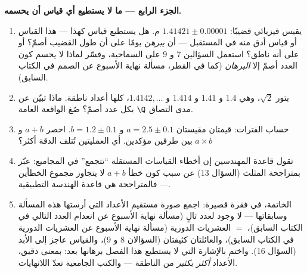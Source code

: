 \begin{problem}
\medskip
\noindent\textbf{الجزء الرابع --- ما لا يستطيع أي قياس أن يحسمه.}
\begin{enumerate}[resume]
  \item يقيس فيزيائي قضيبًا: $1.41421 \pm 0.00001$ م.
        هل يستطيع قياس كهذا --- هذا القياس أو قياس
        أدق منه في المستقبل --- أن \emph{يبرهن} يومًا على أن طول
        القضيب أصمّ؟ أو على أنه ناطق؟ استعمل السؤالين 7
        و 9 على  السماحية، وفسّر لماذا لا يحسم
        كون العدد أصمّ إلا \emph{البرهان} (كما في القطر، مسألة نهاية الأسبوع عن الصمم في الكتاب السابق).
  \item بتور $\sqrt2$، وهي $1.4$ و $1.41$ و $1.414$ و $1.4142,\dots$،
        كلها أعداد ناطقة. ماذا تبيّن عن
        مدى التصاق $\Q$ بكل عدد أصمّ؟
        صُغ الواقعة العامة.
  \item حساب الفترات: قيمتان مقيستان $a = 2.5 \pm 0.1$
        و $b = 1.2 \pm 0.1$. احصر $a + b$ و $a \times b$
        بين طرفين مؤكدين. أي العمليتين تُتلف
        الدقة أكثر؟
  \item تقول قاعدة المهندسين إن أخطاء القياسات
        المستقلة ``تتجمع'' في المجاميع: عبّر بمتراجحة
        المثلث (السؤال 13) عن سبب كون خطأ $a + b$ لا
        يتجاوز مجموع الخطأين --- فالمتراجحة هي
        قاعدة الهندسة التطبيقية.
  \item الخاتمة، في فقرة قصيرة: اجمع صورة
        مستقيم الأعداد التي أرستها هذه المسألة
        وسابقاتها --- لا وجود لعدد تالٍ
        (مسألة نهاية الأسبوع عن انعدام العدد التالي في الكتاب السابق)،  $=$ العشريات
        الدورية (مسألة نهاية الأسبوع عن العشريات الدورية في الكتاب السابق)، والعائلتان كثيفتان
        (السؤالان 8 و 9)، والقياس عاجز إلى الأبد
        (السؤال 16). واختم بالإشارة التي لا يستطيع هذا الفصل
        برهانها بعد: بمعنى دقيق، الأعداد  \emph{أكثر
        بكثير} من الناطقة --- والكتب الجامعية
        تعدّ اللانهايات.
\end{enumerate}
\end{problem}
